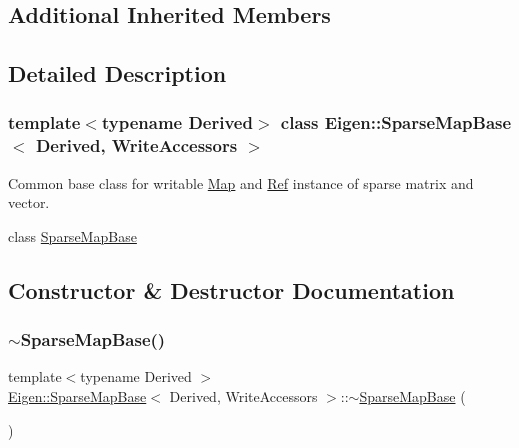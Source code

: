 \subsection*{Additional Inherited Members}


\subsection{Detailed Description}
\subsubsection*{template$<$typename Derived$>$\newline
class Eigen\+::\+Sparse\+Map\+Base$<$ Derived, Write\+Accessors $>$}

Common base class for writable \mbox{\hyperlink{class_eigen_1_1_map}{Map}} and \mbox{\hyperlink{class_eigen_1_1_ref}{Ref}} instance of sparse matrix and vector. 

class \mbox{\hyperlink{class_eigen_1_1_sparse_map_base}{Sparse\+Map\+Base}} 

\subsection{Constructor \& Destructor Documentation}
\mbox{\label{class_eigen_1_1_sparse_map_base_3_01_derived_00_01_write_accessors_01_4_a4dfbcf3ac411885b1710ad04892c984d}} 
\subsubsection{\texorpdfstring{$\sim$SparseMapBase()}{~SparseMapBase()}}
{\footnotesize\ttfamily template$<$typename Derived $>$ \\
\mbox{\hyperlink{class_eigen_1_1_sparse_map_base}{Eigen\+::\+Sparse\+Map\+Base}}$<$ Derived, Write\+Accessors $>$\+::$\sim$\mbox{\hyperlink{class_eigen_1_1_sparse_map_base}{Sparse\+Map\+Base}} (\begin{DoxyParamCaption}{ }\end{DoxyParamCaption})\hspace{0.3cm}{\ttfamily [inline]}}

